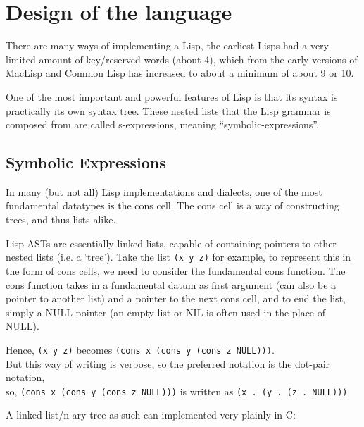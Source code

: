 \documentclass{article}
\newcommand{\code}[1]{\texttt{#1}}
\begin{document}
\section{Design of the language}
  There are many ways of implementing a Lisp, the earliest Lisps had a very
  limited amount of key/reserved words (about 4), which from the early versions
  of MacLisp and Common Lisp has increased to about a minimum of about 9 or 10.

  One of the most important and powerful features of Lisp is that its
  syntax is practically its own syntax tree.  These nested lists that the Lisp
  grammar is composed from are called s-expressions\autocite{sexp}, meaning
  ``symbolic-expressions''.
  \subsection{Symbolic Expressions}
    In many (but not all) Lisp implementations and dialects, one of the most
    fundamental datatypes is the cons cell.  The cons cell is a way of constructing
    trees, and thus lists alike.

    Lisp ASTs are essentially linked-lists, capable of containing pointers to
    other nested lists (i.e. a `tree').
    Take the list \code{(x y z)} for example, to represent this in the form
    of cons cells, we need to consider the fundamental cons function. The cons
    function takes in a fundamental datum as first argument (can also be a pointer
    to another list) and a pointer
    to the next cons cell, and to end the list, simply a NULL pointer (an empty
    list or NIL is often used in the place of NULL).

    Hence, \code{(x y z)} becomes \code{(cons x (cons y (cons z NULL)))}.\\
    But this way of writing is verbose, so the preferred notation is the
    dot-pair notation,\\
    so, \code{(cons x (cons y (cons z NULL)))} is written as \code{(x . (y . (z . NULL)))}

    \clearpage
    A linked-list/n-ary tree as such can implemented very plainly in C:
\end{document}
